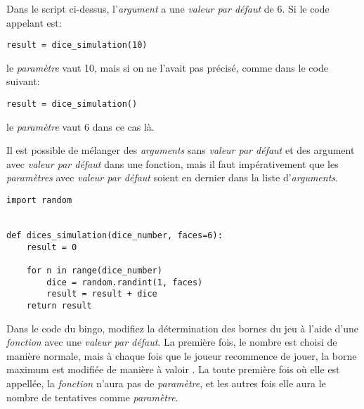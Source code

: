 Dans le script ci-dessus, l'\emph{argument} a une \emph{valeur par défaut} de 6.
Si le code appelant est:
\begin{lstlisting}
result = dice_simulation(10)
\end{lstlisting}

le \emph{paramètre}  vaut 10, mais si on ne l'avait pas précisé, comme dans le code suivant:

\begin{lstlisting}
result = dice_simulation()
\end{lstlisting}

le \emph{paramètre}  vaut 6 dans ce cas là.

Il est possible de mélanger des \emph{arguments} sans \emph{valeur par défaut} et des argument avec \emph{valeur par défaut} dans une fonction, mais il faut impérativement que les \emph{paramètres} avec \emph{valeur par défaut} soient en dernier dans la liste d'\emph{arguments}.

\begin{lstlisting}
import random


def dices_simulation(dice_number, faces=6):
	result = 0
	
	for n in range(dice_number)
		dice = random.randint(1, faces)
		result = result + dice
	return result
\end{lstlisting}

Dans le code du bingo, modifiez la détermination des bornes du jeu à l'aide d'une \emph{fonction} avec une \emph{valeur par défaut}.
La première fois, le nombre est choisi de manière normale, mais à chaque fois que le joueur recommence de jouer, la borne maximum est modifiée de manière à valoir .
La toute première fois où elle est appellée, la \emph{fonction} n'aura pas de \emph{paramètre}, et les autres fois elle aura le nombre de tentatives comme \emph{paramètre}.